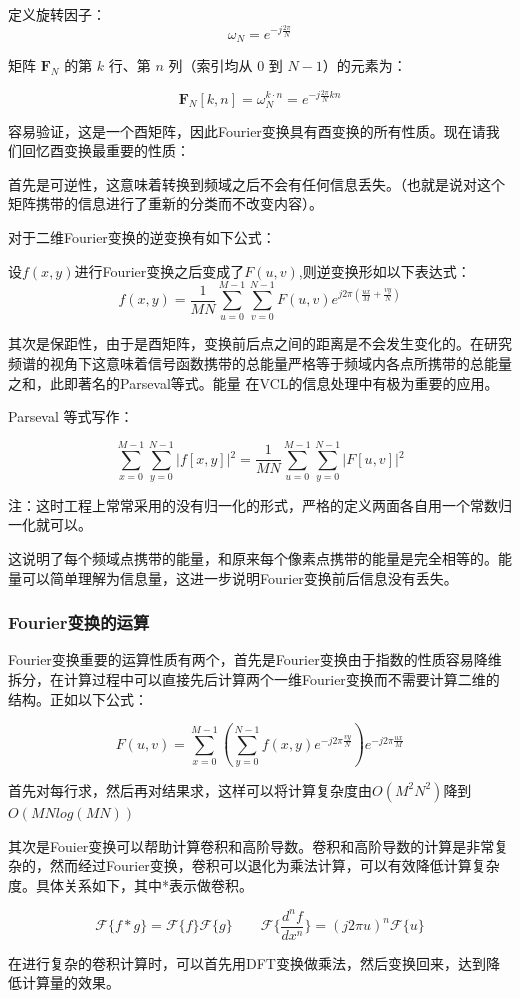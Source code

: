 \begin{definition}[Fourier矩阵]
    定义旋转因子：$$\omega_N = e^{-j\frac{2\pi}{N}}$$

    矩阵 $\mathbf{F}_N$ 的第 $k$ 行、第 $n$ 列（索引均从 $0$ 到 $N-1$）的元素为：
    
    $$\mathbf{F}_N[k, n] = \omega_N^{k \cdot n} = e^{-j\frac{2\pi}{N} kn}$$
\end{definition}

容易验证，这是一个酉矩阵，因此Fourier变换具有酉变换的所有性质。现在请我们回忆酉变换最重要的性质：

首先是可逆性，这意味着转换到频域之后不会有任何信息丢失。（也就是说对这个矩阵携带的信息进行了重新的分类而不改变内容）。

对于二维Fourier变换的逆变换有如下公式：

\begin{theorem}[Fourier变换的逆变换]
    设$f(x,y)$进行Fourier变换之后变成了$F(u,v)$,则逆变换形如以下表达式：
    \[
    f(x, y) = \frac{1}{MN} \sum_{u=0}^{M-1} \sum_{v=0}^{N-1} F(u,v) e^{j2\pi\left(\frac{ux}{M}+ \frac{vy}{N}\right)}
    \]
\end{theorem}

其次是保距性，由于是酉矩阵，变换前后点之间的距离是不会发生变化的。在研究频谱的视角下这意味着信号函数携带的总能量严格等于频域内各点所携带的总能量之和，此即著名的Parseval等式。能量
在VCL的信息处理中有极为重要的应用。

\begin{theorem}[Parseval等式]
    Parseval 等式写作：
    
    $$\sum_{x=0}^{M-1} \sum_{y=0}^{N-1} \vert{}f[x, y]\vert{}^2 = \frac{1}{MN} \sum_{u=0}^{M-1} \sum_{y=0}^{N-1} \vert{}F[u, v]\vert{}^2$$

    注：这时工程上常常采用的没有归一化的形式，严格的定义两面各自用一个常数归一化就可以。
\end{theorem}

这说明了每个频域点携带的能量，和原来每个像素点携带的能量是完全相等的。能量可以简单理解为信息量，这进一步说明Fourier变换前后信息没有丢失。

\subsubsection{Fourier变换的运算}
Fourier变换重要的运算性质有两个，首先是Fourier变换由于指数的性质容易降维拆分，在计算过程中可以直接先后计算两个一维Fourier变换而不需要计算二维的结构。正如以下公式：

\[
F(u, v) = \sum_{x=0}^{M-1} \left( \sum_{y=0}^{N-1} f(x, y) e^{-j 2\pi \frac{vy}{N}} \right) e^{-j 2\pi \frac{ux}{M}}
\]

首先对每行求，然后再对结果求，这样可以将计算复杂度由$O(M^2 N^2)$降到$O(MNlog(MN))$

其次是Fouier变换可以帮助计算卷积和高阶导数。卷积和高阶导数的计算是非常复杂的，然而经过Fourier变换，卷积可以退化为乘法计算，可以有效降低计算复杂度。具体关系如下，其中*表示做卷积。

\[
\mathcal{F} \{f * g\} = \mathcal{F} \{f\} \mathcal{F} \{g\} \qquad \mathcal{F} \{\frac{d^n f}{d x^n}\} = (j 2\pi u)^n \mathcal{F} \{u\}
\]

在进行复杂的卷积计算时，可以首先用DFT变换做乘法，然后变换回来，达到降低计算量的效果。

